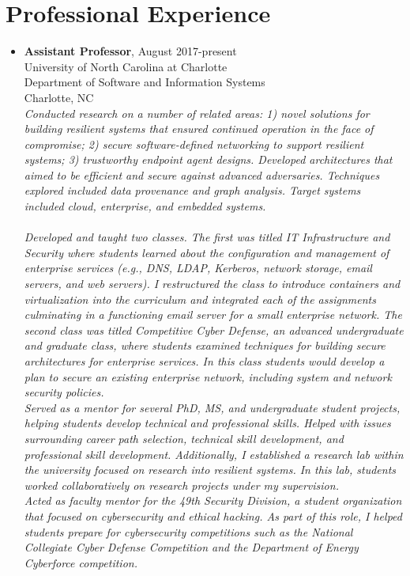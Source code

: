 \documentclass[10pt]{article}
\providecommand{\tightlist}{%
  \setlength{\itemsep}{0.25em}}
\begin{document}
\hypertarget{professional-experience}{%
\section{Professional Experience}\label{professional-experience}}

\begin{itemize}
\tightlist
\item \textbf{Assistant Professor}, August 2017-present\\
  University of North Carolina at Charlotte\\
  Department of Software and Information Systems\\
  Charlotte, NC\\
  \textit{
Conducted research on a number of related areas: 1) novel solutions for building resilient systems that ensured continued operation in the face of compromise; 2) secure software-defined networking to support resilient systems; 3) trustworthy endpoint agent designs. Developed architectures that aimed to be efficient and secure against advanced adversaries. Techniques explored included data provenance and graph analysis. Target systems included cloud, enterprise, and embedded systems.\\
\mbox{}\\
Developed and taught two classes. The first was titled IT Infrastructure and Security where students learned about the configuration and management of enterprise services (e.g., DNS, LDAP, Kerberos, network storage, email servers, and web servers). I restructured the class to introduce containers and virtualization into the curriculum and integrated each of the assignments culminating in a functioning email server for a small enterprise network. The second class was titled Competitive Cyber Defense, an advanced undergraduate and graduate class, where students examined techniques for building secure architectures for enterprise services. In this class students would develop a plan to secure an existing enterprise network, including system and network security policies.
\mbox{}\\
Served as a mentor for several PhD, MS, and undergraduate student projects, helping students develop technical and professional skills. Helped with issues surrounding career path selection, technical skill development, and professional skill development. Additionally, I established a research lab within the university focused on research into resilient systems. In this lab, students worked collaboratively on research projects under my supervision.
\mbox{}\\
Acted as faculty mentor for the 49th Security Division, a student organization that focused on cybersecurity and ethical hacking. As part of this role, I helped students prepare for cybersecurity competitions such as the National Collegiate Cyber Defense Competition and the Department of Energy Cyberforce competition.}


\end{itemize}
\end{document}
